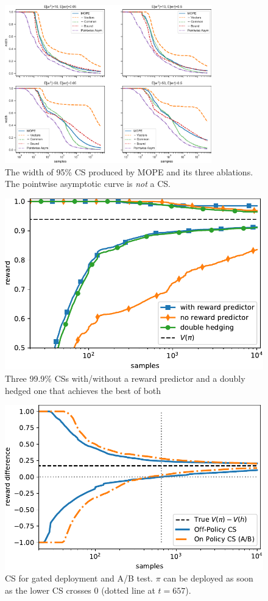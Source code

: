 \begin{figure}
    \centering
    \includegraphics[width=0.8\textwidth]{width}
    \caption{The width of 95\% CS produced by MOPE and its three ablations.
    The pointwise asymptotic curve is \emph{not} a CS.}
    \label{fig:width}
\end{figure}

\begin{figure}
    \centering
    \includegraphics[width=0.75\linewidth]{predictor}
    \caption{Three 99.9\% CSs with/without a reward predictor and a doubly hedged one that achieves the best of both}
    \label{fig:predictor}
\end{figure}

\begin{figure}
    \centering
    \includegraphics[width=0.75\linewidth]{gd2}
    \caption{CS for gated deployment and A/B test. $\pi$ can be 
    deployed as soon as the lower CS crosses 0 (dotted line at $t=657$).}
    \label{fig:gd}
\end{figure}

